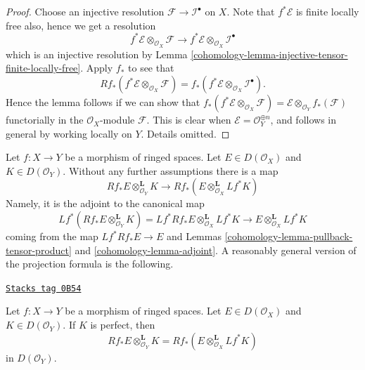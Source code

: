 \begin{proof}

Choose an injective resolution $\mathcal{F} \to \mathcal{I}^\bullet$
on $X$. Note that $f^*\mathcal{E}$ is finite locally free also, hence
we get a resolution
$$
f^*\mathcal{E} \otimes_{\mathcal{O}_X} \mathcal{F}
\longrightarrow
f^*\mathcal{E} \otimes_{\mathcal{O}_X} \mathcal{I}^\bullet
$$
which is an injective resolution by
Lemma \ref{cohomology-lemma-injective-tensor-finite-locally-free}.
Apply $f_*$ to see that
$$
Rf_*(f^*\mathcal{E} \otimes_{\mathcal{O}_X} \mathcal{F})
=
f_*(f^*\mathcal{E} \otimes_{\mathcal{O}_X} \mathcal{I}^\bullet).
$$
Hence the lemma follows if we can show that
$f_*(f^*\mathcal{E} \otimes_{\mathcal{O}_X} \mathcal{F}) =
\mathcal{E} \otimes_{\mathcal{O}_Y} f_*(\mathcal{F})$ functorially
in the $\mathcal{O}_X$-module $\mathcal{F}$. This is clear when
$\mathcal{E} = \mathcal{O}_Y^{\oplus n}$, and follows in general
by working locally on $Y$. Details omitted.
\end{proof}

Let $f : X \to Y$ be a morphism of ringed spaces.
Let $E \in D(\mathcal{O}_X)$ and $K \in D(\mathcal{O}_Y)$.
Without any further assumptions there is a map
\begin{equation}
\label{equation-projection-formula-map}
Rf_*E \otimes^\mathbf{L}_{\mathcal{O}_Y} K
\longrightarrow
Rf_*(E \otimes^\mathbf{L}_{\mathcal{O}_X} Lf^*K)
\end{equation}
Namely, it is the adjoint to the canonical map
$$
Lf^*(Rf_*E \otimes^\mathbf{L}_{\mathcal{O}_Y} K) =
Lf^*Rf_*E \otimes^\mathbf{L}_{\mathcal{O}_X} Lf^*K
\longrightarrow
E \otimes^\mathbf{L}_{\mathcal{O}_X} Lf^*K
$$
coming from the map $Lf^*Rf_*E \to E$ and Lemmas
\ref{cohomology-lemma-pullback-tensor-product} and \ref{cohomology-lemma-adjoint}.
A reasonably general version of the projection formula is the following.

\begin{lemma}
\label{cohomology-lemma-projection-formula-perfect}
\href{https://stacks.math.columbia.edu/tag/0B54}{\texttt{Stacks tag 0B54}}

Let $f : X \to Y$ be a morphism of ringed spaces.
Let $E \in D(\mathcal{O}_X)$ and $K \in D(\mathcal{O}_Y)$.
If $K$ is perfect, then
$$
Rf_*E \otimes^\mathbf{L}_{\mathcal{O}_Y} K =
Rf_*(E \otimes^\mathbf{L}_{\mathcal{O}_X} Lf^*K)
$$
in $D(\mathcal{O}_Y)$.
\end{lemma}


